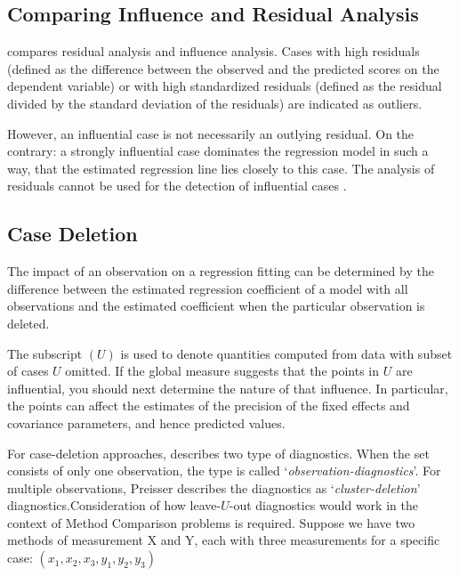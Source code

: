 \documentclass[12pt, a4paper]{report}
\theoremstyle{definition}
\theoremstyle{remark}
\begin{document}
\subsection{Comparing Influence and Residual Analysis}

\citet{influenceLME4} compares residual analysis and influence analysis. Cases with high residuals (defined as the difference between the observed and the predicted scores on the dependent
variable) or with high standardized residuals (defined as the residual divided by the standard deviation
of the residuals) are indicated as outliers.

However, an influential case is not necessarily an outlying residual. On the contrary: a strongly influential case dominates
the regression model in such a way, that the estimated regression line lies closely to this case. The analysis of residuals cannot be used for the detection of influential cases \citep{crawley2012r}.







\subsection*{Case Deletion}

The impact of an observation on a regression fitting can be determined by the difference between the estimated regression coefficient of a model with all observations and the estimated coefficient when the particular observation is deleted. 

The subscript $(U)$ is used to denote quantities computed from data with subset of cases $U$ omitted.
If the global measure suggests that the points in $U$ are influential, you should next determine the nature of
that influence. In particular, the points can affect the estimates of the precision of the fixed effects and covariance parameters, and hence predicted values.


For case-deletion approaches, \citet{preisser} describes two type of diagnostics. When the set consists of only one observation, the type is called
`\textit{observation-diagnostics}'. For multiple observations, Preisser describes the diagnostics as `\textit{cluster-deletion}' diagnostics.Consideration of how leave-$U$-out diagnostics would work in the context of Method Comparison problems is required.  Suppose we have two methods of measurement X and Y, each with three measurements for a specific case: $(x_1,x_2,x_3,y_1,y_2,y_3)$
\end{document}

